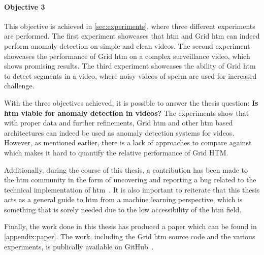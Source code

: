 \paragraph*{Objective 3} \emph{}
\par
This objective is achieved in \autoref{sec:experiments}, where three different experiments are performed. The first experiment showcases that \gls*{htm} and Grid \gls*{htm} can indeed perform anomaly detection on simple and clean videos. The second experiment showcases the performance of Grid \gls*{htm} on a complex surveillance video, which shows promising results. The third experiment showcases the ability of Grid \gls*{htm} to detect segments in a video, where noisy videos of sperm are used for increased challenge.
\par
With the three objectives achieved, it is possible to answer the thesis question: \textbf{Is \gls*{htm} viable for anomaly detection in videos?} The experiments show that with proper data and further refinements, Grid \gls*{htm} and other \gls*{htm} based architectures can indeed be used as anomaly detection systems for videos. However, as mentioned earlier, there is a lack of approaches to compare against which makes it hard to quantify the relative performance of Grid HTM.
\par
Additionally, during the course of this thesis, a contribution has been made to the  \gls*{htm} community in the form of uncovering and reporting a bug related to the technical implementation of  \gls*{htm}~\cite{github_contrib}. It is also important to reiterate that this thesis acts as a general guide to \gls*{htm} from a machine learning perspective, which is something that is sorely needed due to the low accessibility of the \gls*{htm} field.
\par
Finally, the work done in this thesis has produced a paper which can be found in \autoref{appendix:paper}. The work, including the Grid \gls*{htm} source code and the various experiments, is publically available on GitHub~\cite{master_thesis_github}.
